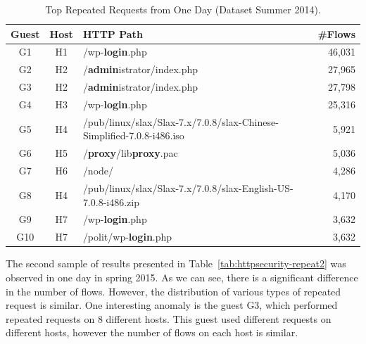 \begin{table}[ht]
\centering
\begin{tabular}{| c | c | l | r|} \hline
Guest & Host & HTTP Path & \#Flows \\ \hline
G1  & H1 &                 /wp-\textbf{login}.php & 46,031 \\ \hline
G2  & H2 &      /\textbf{admin}istrator/index.php & 27,965 \\ \hline
G3  & H2 &      /\textbf{admin}istrator/index.php & 27,798 \\ \hline
G4  & H3 &                 /wp-\textbf{login}.php & 25,316 \\ \hline
G5  & H4 & \parbox[t]{5cm}{/pub/linux/slax/Slax-7.x/7.0.8/slax-Chinese-Simplified-7.0.8-i486.iso} & 5,921 \\ \hline
G6  & H5 &           /\textbf{proxy}/lib\textbf{proxy}.pac & 5,036 \\ \hline
G7  & H6 &                        /node/ & 4,286 \\ \hline
G8  & H4 & \parbox[t]{5cm}{/pub/linux/slax/Slax-7.x/7.0.8/slax-English-US-7.0.8-i486.zip} & 4,170 \\ \hline
G9  & H7 &                 /wp-\textbf{login}.php & 3,632 \\ \hline
G10 & H7 &           /polit/wp-\textbf{login}.php & 3,632 \\ \hline
\end{tabular}
\caption{Top Repeated Requests from One Day (Dataset Summer 2014).}
\label{tab:httpsecurity-repeat}
\end{table}

The second sample of results presented in Table~\ref{tab:httpsecurity-repeat2} was observed in one day in spring 2015. As we can see, there is a significant difference in the number of flows. However, the distribution of various types of repeated request is similar. One interesting anomaly is the guest G3, which performed repeated requests on 8 different hosts. This guest used different requests on different hosts, however the number of flows on each host is similar.

